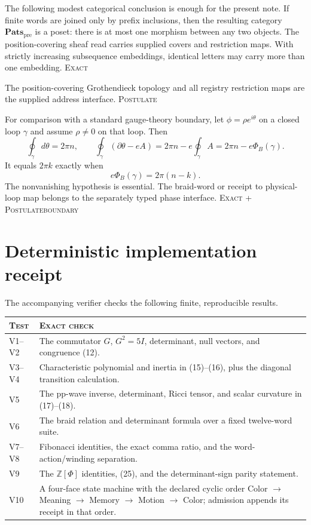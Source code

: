 \documentclass[10pt]{article}
\theoremstyle{remark}
\newcommand{\Pats}{\mathbf{Pats}}
\newcommand{\Z}{\mathbb Z}
\newcommand{\cstatus}[1]{\hfill\textsc{#1}}
\newcommand{\exact}{\textsc{Exact}}
\newcommand{\postulate}{\textsc{Postulate}}
\begin{document}
The following modest categorical conclusion is enough for the present note.
If finite words are joined only by prefix inclusions, then the resulting
category $\Pats_{\mathrm{pre}}$ is a poset: there is at most one morphism
between any two objects.  The position-covering sheaf read carries supplied
covers and restriction maps.  With strictly increasing subsequence embeddings,
identical letters may carry more than one embedding.
\cstatus{\exact}

The position-covering Grothendieck topology and all registry restriction maps
are the supplied address interface. \cstatus{\postulate}

For comparison with a standard gauge-theory boundary, let
$\phi=\rho e^{i\theta}$ on a closed loop $\gamma$ and assume
$\rho\ne0$ on that loop.  Then
\[
 \oint_\gamma d\theta=2\pi n,\qquad
 \oint_\gamma(\partial\theta-eA)=2\pi n-e\oint_\gamma A
 =2\pi n-e\Phi_B(\gamma).
\tag{27}
\]
It equals $2\pi k$ exactly when
\[
 e\Phi_B(\gamma)=2\pi(n-k).
\tag{28}
\]
The nonvanishing hypothesis is essential.  The braid-word or receipt to
physical-loop map belongs to the separately typed phase interface.
\cstatus{\exact\; + \postulate boundary}

\section{Deterministic implementation receipt}

The accompanying verifier checks the following finite, reproducible results.

\begin{center}
\begin{tabular}{@{}p{1.2cm}p{10.9cm}@{}}
\toprule
\textsc{Test} & \textsc{Exact check}\\
\midrule
V1--V2 & The commutator $G$, $G^2=5I$, determinant, null vectors, and congruence (12).\\
V3--V4 & Characteristic polynomial and inertia in (15)--(16), plus the diagonal transition calculation.\\
V5 & The pp-wave inverse, determinant, Ricci tensor, and scalar curvature in (17)--(18).\\
V6 & The braid relation and determinant formula over a fixed twelve-word suite.\\
V7--V8 & Fibonacci identities, the exact comma ratio, and the word-action/winding separation.\\
V9 & The $\Z[\Phi]$ identities, (25), and the determinant-sign parity statement.\\
V10 & A four-face state machine with the declared cyclic order Color $\to$ Meaning $\to$ Memory $\to$ Motion $\to$ Color; admission appends its receipt in that order.\\
\bottomrule
\end{tabular}
\end{center}
\end{document}
